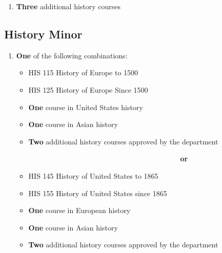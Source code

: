 \documentclass[
  letterpaper,
]{scrbook}
\providecommand{\tightlist}{%
  \setlength{\itemsep}{0pt}\setlength{\parskip}{0pt}}
\begin{document}
\begin{enumerate}
  \begin{itemize}
  \tightlist
  \item
    HIS 465 Seminar in Ancient History\\
  \item
    HIS 466 Seminar Modern East Asian History\\
  \item
    HIS 472 Seminar American History I\\
  \item
    HIS 473 Seminar American History II\\
  \item
    HIS 474 Seminar Modern European History\\
  \end{itemize}
\item
  \textbf{Three} additional history courses
\end{enumerate}

\subsection{History Minor}\label{history-minor}

\begin{enumerate}
\def\labelenumi{\arabic{enumi}.}
\item
  \textbf{One} of the following combinations:

  \begin{itemize}
  \tightlist
  \item
    HIS 115 History of Europe to 1500\\
  \item
    HIS 125 History of Europe Since 1500\\
  \item
    \textbf{One} course in United States history\\
  \item
    \textbf{One} course in Asian history\\
  \item
    \textbf{Two} additional history courses approved by the department
  \end{itemize}

  ~~~~~~~~~~~~~~~~~~~~~~~~~~~~~~~~~~~~~~~~~~~~~ \textbf{or}

  \begin{itemize}
  \tightlist
  \item
    HIS 145 History of United States to 1865\\
  \item
    HIS 155 History of United States since 1865\\
  \item
    \textbf{One} course in European history
  \item
    \textbf{One} course in Asian history\\
  \item
    \textbf{Two} additional history courses approved by the department
  \end{itemize}
\end{enumerate}
\end{document}
